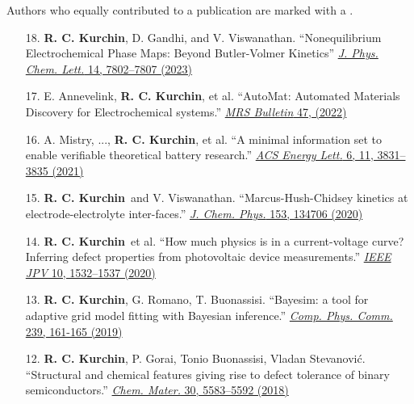 Authors who equally contributed to a publication are marked with a \textdagger.

\newcommand{\myname}{\textbf{R. C. Kurchin}}

\begin{enumerate}
        \item[18.] \myname, D. Gandhi, and V. Viswanathan. ``Nonequilibrium Electrochemical Phase Maps: Beyond Butler-Volmer Kinetics'' \href{https://pubs.acs.org/doi/10.1021/acs.jpclett.3c01992}{\textit{J. Phys. Chem. Lett.} 14, 7802--7807 (2023)}

        \item[17.] E. Annevelink\ec, \myname\ec, et al. ``AutoMat: Automated Materials Discovery for Electrochemical systems.'' \href{https://doi.org/10.1557/s43577-022-00424-0}{\textit{MRS Bulletin} 47, (2022)}

        \item[16.] A. Mistry, ..., \myname, et al. ``A minimal information set to enable verifiable theoretical battery research.'' \href{https://pubs.acs.org/doi/10.1021/acsenergylett.1c01710}{\textit{ACS Energy Lett.} 6, 11, 3831--3835 (2021)}

        \item[15.] \myname~and V. Viswanathan. ``Marcus-Hush-Chidsey kinetics at electrode-electrolyte inter-faces.'' \href{https://aip.scitation.org/doi/10.1063/5.0023611}{\textit{J. Chem. Phys.} 153, 134706 (2020)}

        \item[14.] \myname~et al. ``How much physics is in a current-voltage curve? Inferring defect properties from photovoltaic device measurements.'' \href{https://ieeexplore.ieee.org/document/9157971}{\textit{IEEE JPV} 10, 1532--1537 (2020)}

        \item[13.] \myname, G. Romano, T. Buonassisi. ``Bayesim: a tool for adaptive grid model fitting with Bayesian inference.'' \href{https://www.sciencedirect.com/science/article/pii/S0010465519300414?via\%3Dihub}{\textit{Comp. Phys. Comm.} 239, 161-165 (2019)}

        \item[12.] \myname\ec, P. Gorai\ec, Tonio Buonassisi, Vladan Stevanovi\'c. ``Structural and chemical features giving rise to defect tolerance of binary semiconductors.'' \href{https://pubs.acs.org/doi/10.1021/acs.chemmater.8b01505}{\textit{Chem. Mater.} 30, 5583--5592 (2018)}


\end{enumerate}
